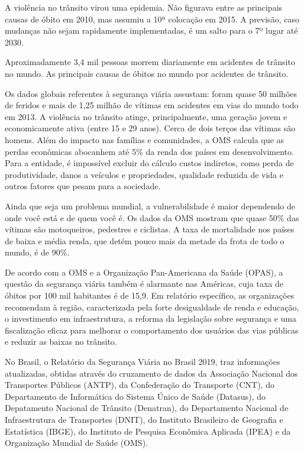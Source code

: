 \documentclass[output=paper,colorlinks,citecolor=green]{langscibook}
\begin{document}
A violência no trânsito virou uma epidemia. Não figurava entre as principais causas de óbito em 2010, mas assumiu a 10ª colocação em 2015. A previsão, caso mudanças não sejam rapidamente implementadas, é um salto para o 7º lugar até 2030.\vskip0.3cm

Aproximadamente 3,4 mil pessoas morrem diariamente em acidentes de trânsito no mundo. As principais causas de óbitos no mundo por acidentes de trânsito.\vskip0.3cm

Os dados globais referentes à segurança viária assustam: foram quase 50 milhões de feridos e mais de 1,25 milhão de vítimas em acidentes em vias do mundo todo em 2013. A violência no trânsito atinge, principalmente, uma geração jovem e economicamente ativa (entre 15 e 29 anos). Cerca de dois terços das vítimas são homens. Além do impacto nas famílias e comunidades, a OMS calcula que as perdas econômicas abocanhem até 5\% da renda dos países em desenvolvimento. Para a entidade, é impossível excluir do cálculo custos indiretos, como perda de produtividade, danos a veículos e propriedades, qualidade reduzida de vida e outros fatores que pesam para a sociedade.\vskip0.3cm

Ainda que seja um problema mundial, a vulnerabilidade é maior dependendo de onde você está e de quem você é. Os dados da OMS mostram que quase 50\% das vítimas são motoqueiros, pedestres e ciclistas. A taxa de mortalidade nos países de baixa e média renda, que detém pouco mais da metade da frota de todo o mundo, é de 90\%.\vskip0.3cm

De acordo com a OMS e a Organização Pan-Americana da Saúde (OPAS), a questão da segurança viária também é alarmante nas Américas, cuja taxa de óbitos por 100 mil habitantes é de 15,9. Em relatório específico, as organizações recomendam à região, caracterizada pela forte desigualdade de renda e educação, o investimento em infraestrutura, a reforma da legislação sobre segurança e uma fiscalização eficaz para melhorar o comportamento dos usuários das vias públicas e reduzir as baixas no trânsito.\vskip0.3cm


No Brasil, o Relatório da Segurança Viária no Brasil 2019,  traz informações atualizadas, obtidas através do cruzamento de dados da Associação Nacional dos Transportes Públicos (ANTP), da Confederação do Transporte (CNT), do Departamento de Informática do Sistema Único de Saúde (Datasus), do Depatamento Nacional de Trânsito (Denatran), do Departamento Nacional de Infraestrutura de Transportes (DNIT), do Instituto Brasileiro de Geografia e Estatística (IBGE), do Instituto de Pesquisa Econômica Aplicada (IPEA) e da Organização Mundial de Saúde (OMS).\vskip0.3cm
\end{document}
